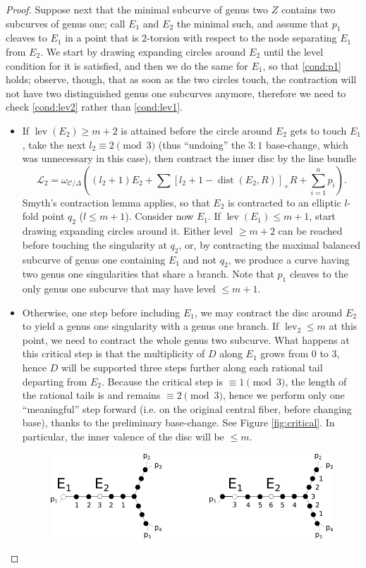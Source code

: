 \documentclass[11pt]{amsart}
\newcommand{\dvr}{\Delta}
\newcommand{\lev}{\operatorname{lev}}
\theoremstyle{plain}
\theoremstyle{definition}
\begin{document}
\begin{proof}
  Suppose next that the minimal subcurve of genus two $Z$ contains two subcurves of genus one; call $E_1$ and $E_2$ the minimal such, and assume that $p_1$ cleaves to $E_1$ in a point that is $2$-torsion with respect to the node separating $E_1$ from $E_2$. We start by drawing expanding circles around $E_2$ until the level condition for it is satisfied, and then we do the same for $E_1$, so that \eqref{cond:p1} holds; observe, though, that as soon as the two circles touch, the contraction will not have two distinguished genus one subcurves anymore, therefore we need to check \eqref{cond:lev2} rather than \eqref{cond:lev1}.
  \begin{itemize}[leftmargin=.4cm]
  \item If $\lev(E_2)\geq m+2$ is attained before the circle around $E_2$ gets to touch $E_1$, take the next $l_2\equiv 2  \pmod 3$ (thus ``undoing'' the $3:1$ base-change, which was unnecessary in this case), then contract the inner disc by the line bundle \[\mathcal L_2=\omega_{\mathcal C/\dvr}((l_2+1)E_2+\sum [l_2+1-\operatorname{dist}(E_2,R)]_+R+\sum_{i=1}^n p_i).\] Smyth's contraction lemma \cite[Lemma 2.13]{SMY1} applies, so that $E_2$ is contracted to an elliptic $l$-fold point $q_2$ ($l\leq m+1$). Consider now $E_1$. If $\lev(E_1)\leq m+1$, start drawing expanding circles around it. Either level $\geq m+2$ can be reached before touching the singularity at $q_2$, or, by contracting the maximal balanced subcurve of genus one containing $E_1$ and not $q_2$, we produce a curve having two genus one singularities that share a branch. Note that $p_1$ cleaves to the only genus one subcurve that may have level $\leq m+1$.
  \item Otherwise, one step before including $E_1$, we may contract the disc around $E_2$ to yield a genus one singularity with a genus one branch. If $\lev_2\leq m$ at this point, we need to contract the whole genus two subcurve. What happens at this critical step is that the multiplicity of $D$ along $E_1$ grows from $0$ to $3$, hence $D$ will be supported three steps further along each rational tail departing from $E_2$. Because the critical step is $\equiv 1\pmod 3$, the length of the rational tails is and remains $\equiv 2 \pmod 3$, hence we perform only one ``meaningful'' step forward (i.e. on the original central fiber, before changing base), thanks to the preliminary base-change. See Figure \ref{fig:critical}. In particular, the inner valence of the disc will be $\leq m$.
  \begin{figure}
   \includegraphics[width=.8\textwidth]{critical_step}

\end{figure}
\end{itemize}
\end{proof}
\end{document}

